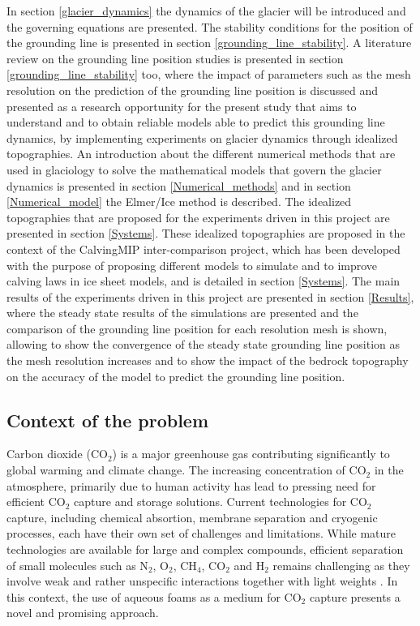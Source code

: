 \documentclass{article}
\begin{document}
In section \ref{glacier_dynamics} the dynamics of the glacier will be introduced and the governing equations are presented. The stability conditions for the position of the grounding line is presented in section \ref{grounding_line_stability}. A literature review on the grounding line position studies is presented in section \ref{grounding_line_stability} too, where the impact of parameters such as the mesh resolution on the prediction of the grounding line position is discussed and presented as a research opportunity for the present study that aims to understand and to obtain reliable models able to predict this grounding line dynamics, by implementing experiments on glacier dynamics through idealized topographies. An introduction about the different numerical methods that are used in glaciology to solve the mathematical models that govern the glacier dynamics is presented in section \ref{Numerical_methods} and in section \ref{Numerical_model} the Elmer/Ice method is described. The idealized topographies that are proposed for the experiments driven in this project are presented in section \ref{Systems}. These idealized topographies are proposed in the context of the CalvingMIP inter-comparison project, which has been developed with the purpose of proposing different models to simulate and to improve calving laws in ice sheet models, and is detailed in section \ref{Systems}. The main results of the experiments driven in this project are presented in section \ref{Results}, where the steady state results of the simulations are presented and the comparison of the grounding line position for each resolution mesh is shown, allowing to show the convergence of the steady state grounding line position as the mesh resolution increases and to show the impact of the bedrock topography on the accuracy of the model to predict the grounding line position. 

\subsection{Context of the problem}

Carbon dioxide (CO$_2$) is a major greenhouse gas contributing significantly to global warming and climate change. The increasing concentration of CO$_2$ in the atmosphere, primarily due to human activity has lead to pressing need for efficient CO$_2$ capture and storage solutions. Current technologies for CO$_2$ capture, including chemical absortion, membrane separation and cryogenic processes, each have their own set of challenges and limitations. While mature technologies are available for large and complex compounds, efficient separation of small molecules such as N$_2$, O$_2$, CH$_4$, CO$_2$ and H$_2$ remains challenging as they involve weak and rather unspecific interactions together with light weights \cite[]{hadji2024soap}. In this context, the use of  aqueous foams as a medium for CO$_2$ capture presents a novel and promising approach. 
\end{document}
